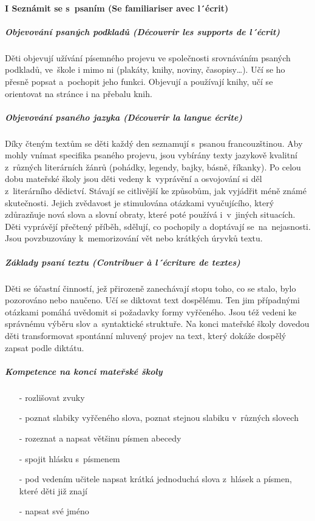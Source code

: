 			\paragraph*{I Seznámit se s psaním (Se familiariser avec l´écrit)}
				\subparagraph{Objevování psaných podkladů (Découvrir les supports de l´écrit)}
					Děti objevují užívání písemného projevu ve společnosti srovnáváním psaných podkladů, ve škole i mimo ni (plakáty, knihy, noviny, časopisy…). Učí se ho přesně popsat a pochopit jeho funkci. Objevují a používají knihy, učí se orientovat na stránce i na přebalu knih. 
				\subparagraph{Objevování psaného jazyka (Découvrir la langue écrite)}
					Díky čteným textům se děti každý den seznamují s psanou francouzštinou. Aby mohly vnímat specifika psaného projevu, jsou vybírány texty jazykově kvalitní z různých literárních žánrů (pohádky, legendy, bajky, básně, říkanky). Po celou dobu mateřské školy jsou děti vedeny k vyprávění a osvojování si děl z literárního dědictví. Stávají se citlivější ke způsobům, jak vyjádřit méně známé skutečnosti. Jejich zvědavost je stimulována otázkami vyučujícího, který zdůrazňuje nová slova a slovní obraty, které poté používá i v jiných situacích.  Děti vyprávějí přečtený příběh, sdělují, co pochopily a doptávají se na nejasnosti. Jsou povzbuzovány k memorizování vět nebo krátkých úryvků textu. 
				\subparagraph{Základy psaní textu (Contribuer à l´écriture de textes)}
					Děti se účastní činností, jež přirozeně zanechávají stopu toho, co se stalo, bylo pozorováno nebo naučeno. Učí se diktovat text dospělému. Ten jim případnými otázkami pomáhá uvědomit si požadavky formy vyřčeného. Jsou též vedeni ke správnému výběru slov a syntaktické struktuře. Na konci mateřské školy dovedou děti transformovat spontánní mluvený projev na text, který dokáže dospělý zapsat podle diktátu.
				\subparagraph{Kompetence na konci mateřské školy \hspace{3cm}}

				\begin{itemize}
					\setlength\itemsep{-2mm}
					\item[-] rozlišovat zvuky
					\item[-] poznat slabiky vyřčeného slova, poznat stejnou slabiku v různých slovech
					\item[-] rozeznat a napsat většinu písmen abecedy
					\item[-] spojit hlásku s písmenem
					\item[-] pod vedením učitele napsat krátká jednoduchá slova z hlásek a písmen, které děti již znají 	
					\item[-] napsat své jméno
				\end{itemize}


